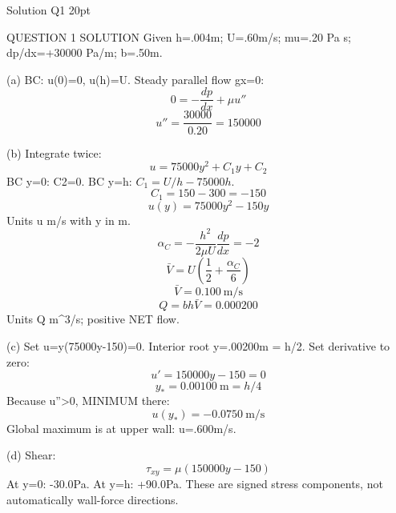Solution Q1 20pt

QUESTION 1 SOLUTION
Given h=.004m; U=.60m/s; mu=.20 Pa s; dp/dx=+30000 Pa/m; b=.50m.

(a) BC: u(0)=0, u(h)=U. Steady parallel flow gx=0:
$$0=-\frac{dp}{dx}+\mu u''$$
$$u''=\frac{30000}{0.20}=150000$$

(b) Integrate twice:
$$u=75000y^2+C_1y+C_2$$
BC y=0: C2=0.
BC y=h: $C_1=U/h-75000h$.
$$C_1=150-300=-150$$
$$u(y)=75000y^2-150y$$
Units u m/s with y in m.
$$\alpha_C=-\frac{h^2}{2\mu U}\frac{dp}{dx}=-2$$
$$\bar V=U(\frac{1}{2}+\frac{\alpha_C}{6})$$
$$\bar V=0.100\ \text{m/s}$$
$$Q=bh\bar V=0.000200$$
Units Q m^3/s; positive NET flow.

(c) Set u=y(75000y-150)=0. Interior root y=.00200m = h/2.
Set derivative to zero:
$$u'=150000y-150=0$$
$$y_*=0.00100\ \text{m}=h/4$$
Because u''>0, MINIMUM there:
$$u(y_*)=-0.0750\ \text{m/s}$$
Global maximum is at upper wall: u=.600m/s.

(d) Shear:
$$\tau_{xy}=\mu(150000y-150)$$
At y=0: -30.0Pa.
At y=h: +90.0Pa.
These are signed stress components, not automatically wall-force directions.
